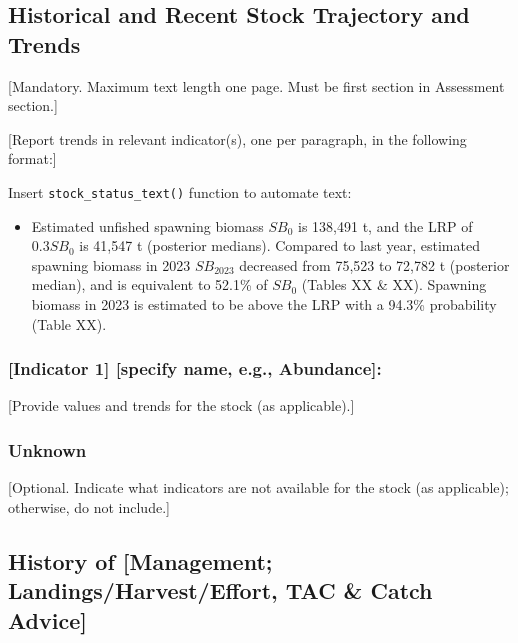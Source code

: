 \documentclass[11pt]{book}
\begin{document}
\hypertarget{historical-and-recent-stock-trajectory-and-trends}{%
\subsection*{Historical and Recent Stock Trajectory and Trends}\label{historical-and-recent-stock-trajectory-and-trends}}

{[}Mandatory. Maximum text length one page. Must be first section in Assessment section.{]}

{[}Report trends in relevant indicator(s), one per paragraph, in the following format:{]}

Insert \texttt{stock\_status\_text()} function to automate text:
\begin{itemize}

\item
  Estimated unfished spawning biomass \(\mathit{SB}_0\) is 138,491 t, and the LRP of \(0.3\mathit{SB}_0\) is 41,547 t (posterior medians). Compared to last year, estimated spawning biomass in 2023 \(\mathit{SB}_{2023}\) decreased from 75,523 to 72,782 t (posterior median), and is equivalent to 52.1\% of \(\mathit{SB}_0\) (Tables XX \& XX). Spawning biomass in 2023 is estimated to be above the LRP with a 94.3\% probability (Table XX).
\end{itemize}
\hypertarget{indicator-1-specify-name-e.g.-abundance}{%
\subsubsection*{{[}Indicator 1{]} {[}specify name, e.g., Abundance{]}:}\label{indicator-1-specify-name-e.g.-abundance}}

{[}Provide values and trends for the stock (as applicable).{]}

\hypertarget{unknown}{%
\subsubsection*{Unknown}\label{unknown}}

{[}Optional. Indicate what indicators are not available for the stock (as applicable); otherwise, do not include.{]}

\hypertarget{history-of-management-landingsharvesteffort-tac-catch-advice}{%
\subsection*{History of {[}Management; Landings/Harvest/Effort, TAC \& Catch Advice{]}}\label{history-of-management-landingsharvesteffort-tac-catch-advice}}
\end{document}
